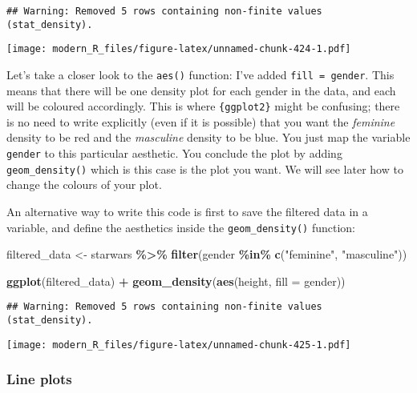 \documentclass[
]{article}
\newenvironment{Shaded}{\begin{snugshade}}{\end{snugshade}}
\newcommand{\DataTypeTok}[1]{\textcolor[rgb]{0.13,0.29,0.53}{#1}}
\newcommand{\KeywordTok}[1]{\textcolor[rgb]{0.13,0.29,0.53}{\textbf{#1}}}
\newcommand{\NormalTok}[1]{#1}
\newcommand{\OperatorTok}[1]{\textcolor[rgb]{0.81,0.36,0.00}{\textbf{#1}}}
\newcommand{\StringTok}[1]{\textcolor[rgb]{0.31,0.60,0.02}{#1}}
\begin{document}
\begin{verbatim}
## Warning: Removed 5 rows containing non-finite values (stat_density).
\end{verbatim}

\texttt{[image: modern\_R\_files/figure-latex/unnamed-chunk-424-1.pdf]}

Let's take a closer look to the \texttt{aes()} function: I've added \texttt{fill\ =\ gender}. This means that
there will be one density plot for each gender in the data, and each will be coloured accordingly.
This is where \texttt{\{ggplot2\}} might be confusing; there is no need to write explicitly (even if it is
possible) that you want the \emph{feminine} density to be red and the \emph{masculine} density to be blue. You just
map the variable \texttt{gender} to this particular aesthetic. You conclude the plot by adding
\texttt{geom\_density()} which is this case is the plot you want. We will see later how to change the
colours of your plot.

An alternative way to write this code is first to save the filtered data in a variable, and define
the aesthetics inside the \texttt{geom\_density()} function:

\begin{Shaded}
\begin{Highlighting}[]
\NormalTok{filtered\_data \textless{}{-}}\StringTok{ }\NormalTok{starwars }\OperatorTok{\%\textgreater{}\%}
\StringTok{  }\KeywordTok{filter}\NormalTok{(gender }\OperatorTok{\%in\%}\StringTok{ }\KeywordTok{c}\NormalTok{(}\StringTok{"feminine"}\NormalTok{, }\StringTok{"masculine"}\NormalTok{))}

\KeywordTok{ggplot}\NormalTok{(filtered\_data) }\OperatorTok{+}
\StringTok{  }\KeywordTok{geom\_density}\NormalTok{(}\KeywordTok{aes}\NormalTok{(height, }\DataTypeTok{fill =}\NormalTok{ gender))}
\end{Highlighting}
\end{Shaded}

\begin{verbatim}
## Warning: Removed 5 rows containing non-finite values (stat_density).
\end{verbatim}

\texttt{[image: modern\_R\_files/figure-latex/unnamed-chunk-425-1.pdf]}

\hypertarget{line-plots}{%
\subsubsection{Line plots}\label{line-plots}}
\end{document}
